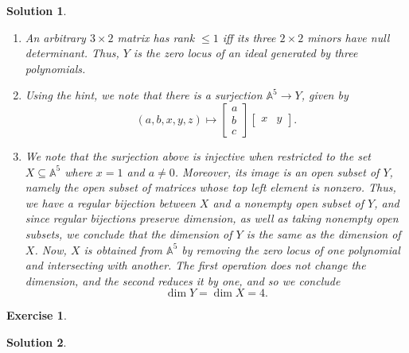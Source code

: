 \documentclass{article}
\newtheorem{ex}{Exercise}
\theoremstyle{nonumberplain}
\newtheorem{sol}{Solution}
\newcommand{\Aff}{\mathbb{A}}
\begin{document}
\begin{sol}
\leavevmode
\begin{enumerate}
\item An arbitrary $3 \times 2$ matrix has rank $\leq 1$ iff its three $2 \times 2$ minors have null determinant. Thus, $Y$ is the zero locus of an ideal generated by three polynomials.
\item Using the hint, we note that there is a surjection $\Aff^5 \to Y$, given by
\begin{equation}
(a,b,x,y,z) \mapsto \begin{bmatrix}
a \\ b \\ c
\end{bmatrix}
\begin{bmatrix}
x & y
\end{bmatrix}.
\end{equation}
\item We note that the surjection above is injective when restricted to the set $X \subseteq \Aff^5$ where $x = 1$ and $a \neq 0$. Moreover, its image is an open subset of $Y$, namely the open subset of matrices whose top left element is nonzero. Thus, we have a regular bijection between $X$ and a nonempty open subset of $Y$, and since regular bijections preserve dimension, as well as taking nonempty open subsets, we conclude that the dimension of $Y$ is the same as the dimension of $X$. Now, $X$ is obtained from $\Aff^5$ by removing the zero locus of one polynomial and intersecting with another. The first operation does not change the dimension, and the second reduces it by one, and so we conclude
\begin{equation}
\dim Y = \dim X = 4.
\end{equation}
\end{enumerate}
\end{sol}

\begin{ex}
\end{ex}

\begin{sol}
\end{sol}
\end{document}
